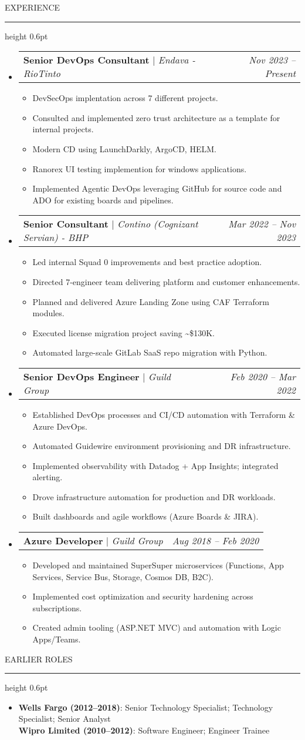 \documentclass[letterpaper,10pt]{article}
\makeatletter
\newcommand{\expItem}[1]{\item{{#1 \vspace{-4pt}}}}
\newcommand{\expItemListStart}{\begin{itemize}}
\newcommand{\expItemListEnd}{\end{itemize}\vspace{-4pt}}
\newcommand{\expProjectHeading}[2]{\item\begin{tabular*}{0.97\textwidth}{l@{\extracolsep{\fill}}r}#1 & \textit{ #2} \\ \end{tabular*}\vspace{-6pt}}
\newcommand{\subheadingtitlevspace}{\vspace{-3pt}}
\newcommand{\titleItem}[1]{\textbf{#1}}
\newcommand{\resumeSubHeadingListStart}{\subheadingtitlevspace\begin{itemize}[leftmargin=0.15in, label={}]}
\newcommand{\resumeSubHeadingListEnd}{\end{itemize}}
\newcommand{\ResumeSection}[1]{\par{\fontsize{11pt}{13pt}\selectfont \MakeUppercase{#1}}\vspace{1pt}\hrule height 0.6pt}
\newcommand{\SectionContentGap}{}
\makeatother
\begin{document}
\ResumeSection{Experience}\vspace{-4pt}
\resumeSubHeadingListStart
\expProjectHeading{\titleItem{Senior DevOps Consultant} $|$ \emph{Endava - RioTinto}}{Nov 2023 -- Present}
\expItemListStart
\expItem{DevSecOps implentation across 7 different projects.}
\expItem{Consulted and implemented zero trust architecture as a template for internal projects.}
\expItem{Modern CD using LaunchDarkly, ArgoCD, HELM.}
\expItem{Ranorex UI testing implemention for windows applications.}
\expItem{Implemented Agentic DevOps leveraging GitHub for source code and ADO for existing boards and pipelines.}
\expItemListEnd
\expProjectHeading{\titleItem{Senior Consultant} $|$ \emph{Contino (Cognizant Servian) - BHP}}{Mar 2022 -- Nov 2023}
\expItemListStart
\expItem{Led internal Squad 0 improvements and best practice adoption.}
\expItem{Directed 7-engineer team delivering platform and customer enhancements.}
\expItem{Planned and delivered Azure Landing Zone using CAF Terraform modules.}
\expItem{Executed license migration project saving \textasciitilde{}\$130K.}
\expItem{Automated large-scale GitLab SaaS repo migration with Python.}
\expItemListEnd
\expProjectHeading{\titleItem{Senior DevOps Engineer} $|$ \emph{Guild Group}}{Feb 2020 -- Mar 2022}
\expItemListStart
\expItem{Established DevOps processes and CI/CD automation with Terraform \& Azure DevOps.}
\expItem{Automated Guidewire environment provisioning and DR infrastructure.}
\expItem{Implemented observability with Datadog + App Insights; integrated alerting.}
\expItem{Drove infrastructure automation for production and DR workloads.}
\expItem{Built dashboards and agile workflows (Azure Boards \& JIRA).}
\expItemListEnd
\expProjectHeading{\titleItem{Azure Developer} $|$ \emph{Guild Group}}{Aug 2018 -- Feb 2020}
\expItemListStart
\expItem{Developed and maintained SuperSuper microservices (Functions, App Services, Service Bus, Storage, Cosmos DB, B2C).}
\expItem{Implemented cost optimization and security hardening across subscriptions.}
\expItem{Created admin tooling (ASP.NET MVC) and automation with Logic Apps/Teams.}
\expItemListEnd
\resumeSubHeadingListEnd
\SectionContentGap

\ResumeSection{Earlier Roles}\vspace{-4pt}
\begin{itemize}[leftmargin=0.15in, label={}]
\item{\titleItem{Wells Fargo (2012--2018)}{: Senior Technology Specialist; Technology Specialist; Senior Analyst} \\[-2pt]
        \titleItem{Wipro Limited (2010--2012)}{: Software Engineer; Engineer Trainee}}
\end{itemize}
\SectionContentGap
\end{document}
